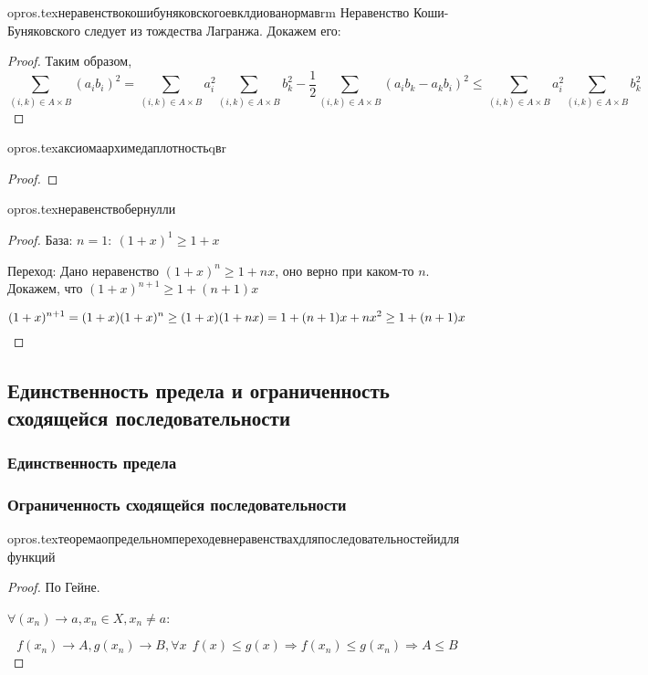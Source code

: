 {opros.tex}{неравенствокошибуняковскогоевклдиованормавrm}
Неравенство Коши-Буняковского следует из тождества Лагранжа. Докажем его:
\begin{proof}
    Таким образом, $$\sum\limits_{(i,k)\in A\times B}(a_ib_i)^2=\sum\limits_{(i,k)\in A\times B}a_i^2\sum\limits_{(i,k)\in A\times B}b_k^2 - \frac{1}{2}\sum\limits_{(i,k)\in A\times B}(a_ib_k-a_kb_i)^2 \leq \sum\limits_{(i,k)\in A\times B}a_i^2\sum\limits_{(i,k)\in A\times B}b_k^2$$
\end{proof}

{opros.tex}{аксиомаархимедаплотностьqвr}
\begin{proof}
\end{proof}

{opros.tex}{неравенствобернулли}
\begin{proof}
    База: $n=1: \ (1+x)^1\geq 1 + x$

    Переход: Дано неравенство $(1+x)^n\geq 1+nx$, оно верно при каком-то $n$. Докажем, что $(1+x)^{n+1}\geq 1 + (n+1)x$

    $$(1+x)^{n+1} = (1+x)(1+x)^n\geq (1+x)(1+nx) = \\ 1 + (n+1)x + nx^2 \geq 1 + (n+1)x$$
\end{proof}

\subsection{Единственность предела и ограниченность сходящейся последовательности}
\subsubsection{Единственность предела}
\subsubsection{Ограниченность сходящейся последовательности}

{opros.tex}{теоремаопредельномпереходевнеравенствахдляпоследовательностейидляфункций}
\begin{proof}
    По Гейне.

    $\forall (x_n)\to a, x_n\in X, x_n\not=a$:

    $$f(x_n)\to A, g(x_n)\to B, \forall x \ \ f(x) \leq g(x) \Rightarrow f(x_n)\leq g(x_n) \Rightarrow A\leq B$$
\end{proof}

